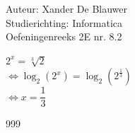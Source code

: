 \documentclass[a4paper]{article}
\begin{document}
\noindent \large Auteur: Xander De Blauwer \\
\noindent \large Studierichting: Informatica\\
\noindent \large Oefeningenreeks 2E nr. 8.2\\

\medskip

\normalsize




$2^x = \sqrt[3]{2}$ \\ 

$\Leftrightarrow \log_2(2^x) = \log_2(2^{\tfrac{1}{3}})$ \\

$\Leftrightarrow x = \dfrac{1}{3}$ \\







\begin{thebibliography}{999}
\end{thebibliography}
\end{document}
